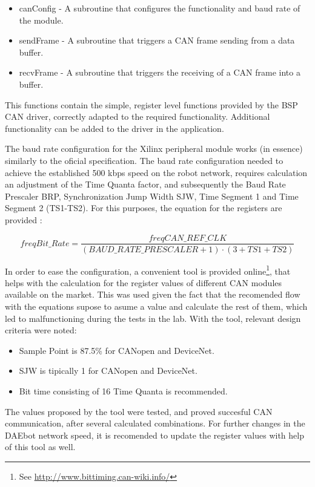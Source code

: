\begin{itemize}
	\item canConfig - A subroutine that configures the functionality and baud rate of the module.
	\item sendFrame - A subroutine that triggers a CAN frame sending from a data buffer.
	\item recvFrame - A subroutine that triggers the receiving of a CAN frame into a buffer.
\end{itemize}

This functions contain the simple, register level functions provided by the BSP CAN driver, correctly adapted to the required functionality. Additional functionality can be added to the driver in the application.

The baud rate configuration for the Xilinx peripheral module works (in essence) similarly to the oficial specification. The baud rate configuration needed to achieve the established 500 kbps speed on the robot network, requires calculation an adjustment of the Time Quanta factor, and subsequently the Baud Rate Prescaler BRP, Synchronization Jump Width SJW, Time Segment 1 and Time Segment 2 (TS1-TS2). For this purposes, the equation for the registers are provided \cite[p.~580]{UG585}:

\begin{equation}
	freqBit\_Rate = \frac{ freqCAN\_REF\_CLK }{ \left( BAUD\_RATE\_PRESCALER + 1 \right) \cdot \left( 3+TS1+TS2 \right) }
\end{equation}

In order to ease the configuration, a convenient tool is provided online\footnote{See \underline{http://www.bittiming.can-wiki.info/}}, that helps with the calculation for the register values of different CAN modules available on the market. This was used given the fact that the recomended flow with the equations supose to asume a value and calculate the rest of them, which led to malfunctioning during the tests in the lab. With the tool, relevant design criteria were noted:
\begin{itemize}
	\item Sample Point is 87.5\% for CANopen and DeviceNet.
	\item SJW is tipically 1 for CANopen and DeviceNet.
	\item Bit time consisting of 16 Time Quanta is recommended.
\end{itemize}

The values proposed by the tool were tested, and proved succesful CAN communication, after several calculated combinations. For further changes in the DAEbot network speed, it is recomended to update the register values with help of this tool as well.

